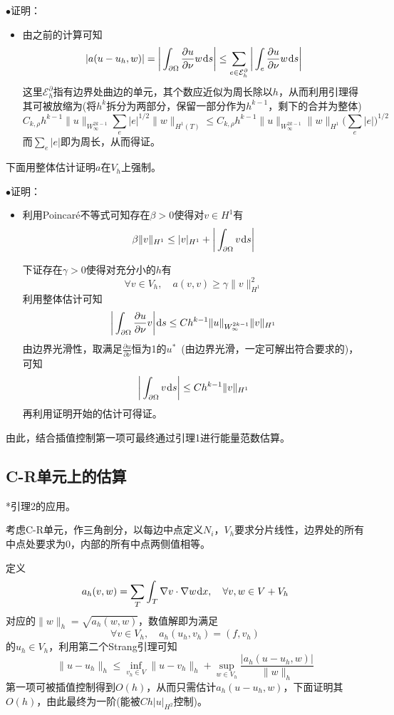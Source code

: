 \documentclass[a4paper,UTF8,fontset=windows]{ctexart}
\newcommand*{\dr}{\hspace{0.07em}\mathrm{d}}
\newcommand*{\ce}{\mathcal{E}}
\newcommand{\proo}[1]{{\kaishu $\bullet$证明：
\begin{itemize}
    \item[] #1
\end{itemize}
}}
\begin{document}
\proo{
    由之前的计算可知
    $$|a(u-u_h,w)|=\bigg|\int_{\partial\Omega}\frac{\partial u}{\partial\nu}w\dr s\bigg|\le\sum_{e\in\ce_h^\partial}\bigg|\int_e\frac{\partial u}{\partial\nu}w\dr s\bigg|$$
    这里$\ce_h^\partial$指有边界处曲边的单元，其个数应近似为周长除以$h$，从而利用引理得其可被放缩为(将$h^k$拆分为两部分，保留一部分作为$h^{k-1}$，剩下的合并为整体)
    $$C_{k,\rho}h^{k-1}\|u\|_{W_\infty^{2k-1}}\sum_e|e|^{1/2}\|w\|_{H^1(T)}\le C_{k,\rho}h^{k-1}\|u\|_{W_\infty^{2k-1}}\|w\|_{H^1}\bigg(\sum_e|e|\bigg)^{1/2}$$
    而$\sum_e|e|$即为周长，从而得证。
}

下面用整体估计证明$a$在$V_h$上强制。

\proo{
    利用Poincar\'e不等式可知存在$\beta>0$使得对$v\in H^1$有
    $$\beta\|v\|_{H^1}\le|v|_{H^1}+\bigg|\int_{\partial\Omega}v\dr s\bigg|$$

    下证存在$\gamma>0$使得对充分小的$h$有
    $$\forall v\in V_h,\quad a(v,v)\ge\gamma\|v\|_{H^1}^2$$
    利用整体估计可知
    $$\bigg|\int_{\partial\Omega}\frac{\partial u}{\partial \nu}v\bigg|\dr s\le Ch^{k-1}\|u\|_{W_\infty^{2k-1}}\|v\|_{H^1}$$
    由边界光滑性，取满足$\frac{\partial u}{\partial\nu}$恒为1的$u^*$\ (由边界光滑，一定可解出符合要求的)，可知
    $$\bigg|\int_{\partial\Omega}v\dr s\bigg|\le Ch^{k-1}\|v\|_{H^1}$$
    再利用证明开始的估计可得证。
}

由此，结合插值控制第一项可最终通过引理1进行能量范数估算。

\subsection{C-R单元上的估算}
*引理2的应用。

考虑C-R单元，作三角剖分，以每边中点定义$N_i$，$V_h$要求分片线性，边界处的所有中点处要求为0，内部的所有中点两侧值相等。

定义
$$a_h(v,w)=\sum_T\int_T\nabla v\cdot\nabla w\dr x,\quad\forall v,w\in V+V_h$$
对应的$\|w\|_h=\sqrt{a_h(w,w)}$，数值解即为满足
$$\forall v\in V_h,\quad a_h(u_h,v_h)=(f,v_h)$$
的$u_h\in V_h$，利用第二个Strang引理可知
$$\|u-u_h\|_h\le\inf_{v_h\in V}\|u-v_h\|_h+\sup_{w\in V_h}\frac{|a_h(u-u_h,w)|}{\|w\|_h}$$
第一项可被插值控制得到$O(h)$，从而只需估计$a_h(u-u_h,w)$，下面证明其$O(h)$，由此最终为一阶(能被$Ch|u|_{H^2}$控制)。
\end{document}
